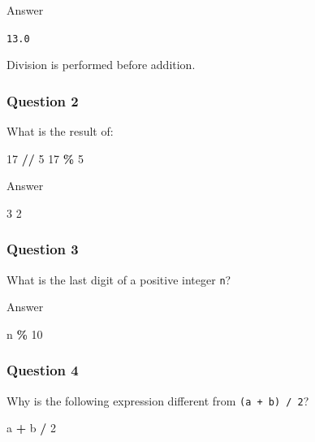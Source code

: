 \documentclass[
]{article}
\newenvironment{Shaded}{\begin{snugshade}}{\end{snugshade}}
\newcommand{\DecValTok}[1]{\textcolor[rgb]{0.00,0.00,0.81}{#1}}
\newcommand{\NormalTok}[1]{#1}
\newcommand{\OperatorTok}[1]{\textcolor[rgb]{0.81,0.36,0.00}{\textbf{#1}}}
\begin{document}
Answer

\texttt{13.0}

Division is performed before addition.

\subsubsection{Question 2}\label{question-2-1}

What is the result of:

\begin{Shaded}
\begin{Highlighting}[]
\DecValTok{17} \OperatorTok{//} \DecValTok{5}
\DecValTok{17} \OperatorTok{\%} \DecValTok{5}
\end{Highlighting}
\end{Shaded}

Answer

\begin{Shaded}
\begin{Highlighting}[]
\NormalTok{3}
\NormalTok{2}
\end{Highlighting}
\end{Shaded}

\subsubsection{Question 3}\label{question-3-1}

What is the last digit of a positive integer \texttt{n}?

Answer

\begin{Shaded}
\begin{Highlighting}[]
\NormalTok{n }\OperatorTok{\%} \DecValTok{10}
\end{Highlighting}
\end{Shaded}

\subsubsection{Question 4}\label{question-4-1}

Why is the following expression different from \texttt{(a\ +\ b)\ /\ 2}?

\begin{Shaded}
\begin{Highlighting}[]
\NormalTok{a }\OperatorTok{+}\NormalTok{ b }\OperatorTok{/} \DecValTok{2}
\end{Highlighting}
\end{Shaded}
\end{document}

